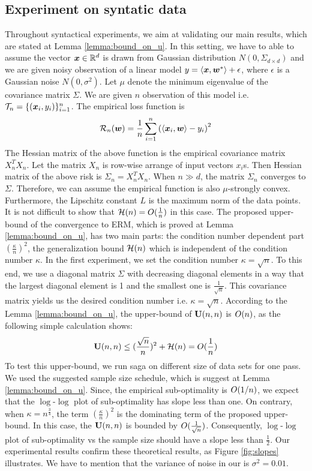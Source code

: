 \documentclass{article}
\begin{document}
\subsection{Experiment on syntatic data}
Throughout syntactical experiments, we aim at validating our main results,
which are stated at Lemma \ref{lemma:bound_on_u}. In this setting, we have to able to 
assume the vector $\bm{x} \in \mathbb{R}^d$ is drawn from Gaussian distribution
$N(0,\Sigma_{d \times d})$ and we are given noisy observation of a linear model $y = \langle \bm{x}, \bm{w}^* \rangle + \epsilon$, where $\epsilon$ is a Gaussian noise $N(0,\sigma^2)$. Let $\mu$ denote the minimum eigenvalue of the
covariance matrix $\Sigma$.
We are given $n$ observation of this model i.e.
 ${\cal T}_n = \{ 
(\bm{x}_i,y_i)\}_{i=1}^n$. The empirical loss function is 
\begin{equation*}
	{\cal R}_n(\bm{w}) = \frac{1}{n} \sum_{i=1}^n \left(\langle \bm{x}_i, \bm{w}\rangle -
	y_i\right)^2
\end{equation*}
The Hessian matrix of the above function is the empirical covariance matrix
$X_n^T X_n$.
Let the matrix $X_n$ is row-wise arrange of input vectors $x_i$s. Then
Hessian matrix of the above risk is $\Sigma_n = X_n^T X_n$. When $n \gg d$, the
matrix $\Sigma_n$ converges to $\Sigma$. Therefore, we can assume the
empirical function is also $\mu$-strongly convex. Furthermore, the Lipschitz
constant $L$ is the maximum norm of the data points. It is not difficult to
show that ${\cal H}(n) = O(\frac{1}{n})$ in this case.
The proposed upper-bound of the convergence to ERM, which is proved at Lemma
\ref{lemma:bound_on_u}, has two main parts: the condition number dependent part $(\frac{\kappa}{n})^2$, the
generalization bound ${\cal H}(n)$ which is independent of the condition number
$\kappa$. In the first experiment, we set the condition number $\kappa =
\sqrt{n}$. To this end, we use a diagonal matrix
$\Sigma$ with decreasing diagonal elements in a way that the largest diagonal
element is 1 and the smallest one is $\frac{1}{\sqrt{n}}$. This covariance
matrix yields us the desired condition number i.e. $\kappa = \sqrt{n}$.
According to the Lemma \ref{lemma:bound_on_u}, the upper-bound of $\mathbf U(n,n)$ is
$O(n)$, as the following simple calculation shows: 
\begin{equation*}
	\mathbf U(n,n) \leq (\frac{\sqrt{n}}{n})^2 + {\cal H}(n) = O(\frac{1}{n})
\end{equation*}
To test this upper-bound, we run saga on different size of data sets for one
pass. We used the suggested sample size schedule, which is suggest at Lemma
\ref{lemma:bound_on_u}. Since, the empirical sub-optimality is $O(1/n)$, we
expect that the $\log$-$\log$ plot of sub-optimality has slope less than one. On
contrary, when $\kappa = n^{\frac{3}{4}}$, the term $(\frac{\kappa}{n})^2$ is the
dominating term of the proposed upper-bound. In this case, the $\mathbf U(n,n)$ is
bounded by $O(\frac{1}{\sqrt{n}})$. Consequently, $\log$-$\log$ plot of
sub-optimality vs the sample size should have a slope less than $\frac{1}{2}$.
Our experimental results confirm these theoretical results, as Figure \ref{fig:slopes}
illustrates. We have to mention that the variance of noise in our is $\sigma^2
= 0.01$.
\end{document}
